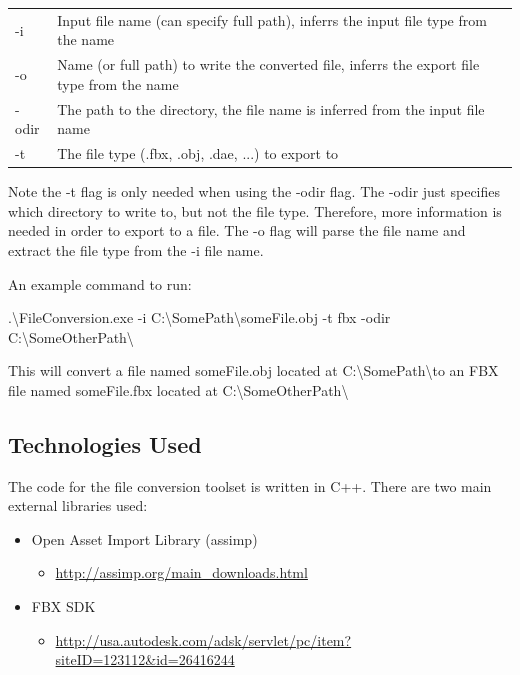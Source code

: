     \begin{table}[h]
        \centering
        \begin{tabular}{l  l}
            -i & Input file name (can specify full path), inferrs the input file type from the name \\
            -o & Name (or full path) to write the converted file, inferrs the export file type from the name \\
            -odir & The path to the directory, the file name is inferred from the input file name \\
            -t & The file type (.fbx, .obj, .dae, ...) to export to
        \end{tabular}
    \end{table}

    Note the -t flag is only needed when using the -odir flag.  The -odir just specifies which directory to write to, but not the file type.
    Therefore, more information is needed in order to export to a file.  The -o flag will parse the file name and extract the file type from the -i file name.

    An example command to run:

    \begin{center}
        .\textbackslash FileConversion.exe -i C:\textbackslash SomePath\textbackslash someFile.obj -t fbx -odir C:\textbackslash SomeOtherPath\textbackslash
    \end{center}

    This will convert a file named someFile.obj located at C:\textbackslash SomePath\textbackslash  to an FBX file named someFile.fbx located at 
    C:\textbackslash SomeOtherPath\textbackslash

    \subsection{Technologies Used}

    The code for the file conversion toolset is written in C++.  There are two main external libraries used:
    \begin{itemize}
        \item Open Asset Import Library (assimp)
        \begin{itemize}
            \item \url{http://assimp.org/main_downloads.html}
        \end{itemize}

        \item FBX SDK
        \begin{itemize}
            \item \url{http://usa.autodesk.com/adsk/servlet/pc/item?siteID=123112&id=26416244}
        \end{itemize}
    \end{itemize}

